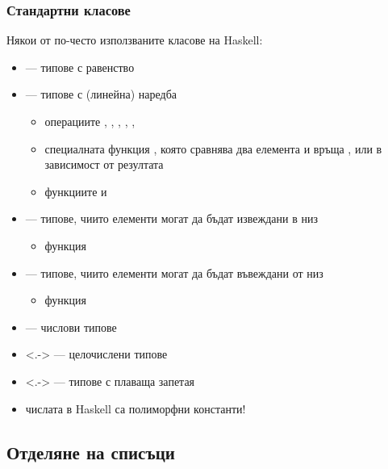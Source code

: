 \documentclass{beamer}
\begin{document}
\begin{frame}
  \frametitle{Стандартни класове}

  Някои от по-често използваните класове на Haskell:
  \begin{itemize}[<+->]
  \item {} --- типове с равенство
  \item {} --- типове с (линейна) наредба
    \begin{itemize}[<.->]
    \item операциите \lst{==}, \lst{/=}, \lst{>=}, \lst{<=}, \lst{<}, \lst{>}
    \item специалната функция , която сравнява два елемента и връща ,  или  в зависимост от резултата
    \item функциите  и 
    \end{itemize}
  \item {} --- типове, чиито елементи могат да бъдат извеждани в низ
    \begin{itemize}[<.->]
    \item функция 
    \end{itemize}
  \item {} --- типове, чиито елементи могат да бъдат въвеждани от низ
    \begin{itemize}[<.->]
    \item функция 
    \end{itemize}
  \item {} --- числови типове
  \item<.->  --- целочислени типове
  \item<.->  --- типове с плаваща запетая
  \item \alert{числата в Haskell са полиморфни константи!}
  \end{itemize}
\end{frame}

\subsection{Отделяне на списъци}
\end{document}
